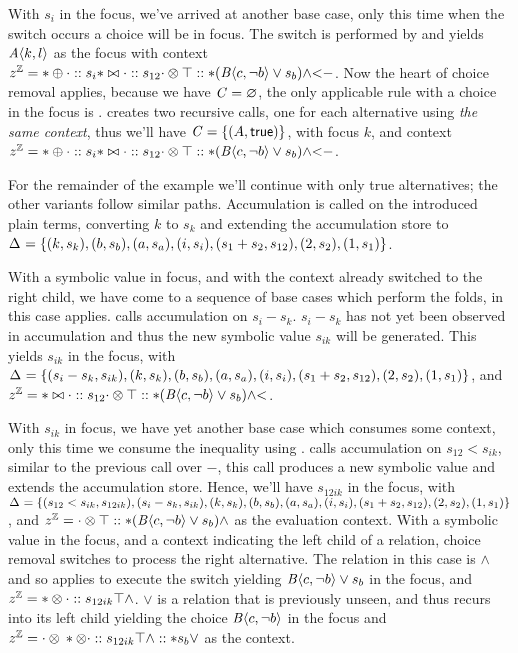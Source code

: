 With $s_{i}$ in the focus, we've arrived at another base case, only this time
when the switch occurs a choice will be in focus. The switch is performed by
\crArithL{} and yields $\chc[A]{k, l}$ as the focus with context $\zipper =
\inArithR*{s_{i}}{\inInEqR*{s_{12}}{\inBoolL*{\inRoot{}}{(\chc[B]{c,\neg b}
      \vee{} s_{b})}{\wedge}}{<}}{-}$. Now the heart of choice removal applies,
because we have $\configuration{} = \varnothing$, the only applicable rule with a
choice in the focus is \crChc. \crChc{} creates two recursive calls, one for
each alternative using \emph{the same context}, thus we'll have $\configuration=
\set{(A,\true)}$, with focus $k$, and context $\zipper =
\inArithR*{s_{i}}{\inInEqR*{s_{12}}{\inBoolL*{\inRoot{}}{(\chc[B]{c,\neg b}
      \vee{} s_{b})}{\wedge}}{<}}{-}$.

For the remainder of the example we'll continue with only true alternatives; the
other variants follow similar paths. Accumulation is called on the introduced
plain terms, converting $k$ to $s_{k}$ and extending the accumulation store to
\newline$\aStore{}=\set{(k,s_{k}),(b, s_{b}),(a,s_{a}),(i, s_{i}),(s_{1} +
  s_{2}, s_{12}), (2,s_{2}), (1,s_{1})}$.

With a symbolic value in focus, and with the context already switched to the
right child, we have come to a sequence of base cases which perform the folds,
in this case \crArithR{} applies. \crArithR{} calls accumulation on $s_{i} -
s_{k}$. $s_{i} - s_{k}$ has not yet been observed in accumulation and thus the
new symbolic value $s_{ik}$ will be generated. This yields $s_{ik}$ in the
focus, with $\aStore{}=\set{(s_{i} - s_{k}, s_{ik}), (k,s_{k}),(b,
  s_{b}),(a,s_{a}),(i, s_{i}),(s_{1} + s_{2}, s_{12}), (2,s_{2}), (1,s_{1})}$,
and $\zipper = \inInEqR*{s_{12}}{\inBoolL*{\inRoot{}}{(\chc[B]{c,\neg b} \vee{}
    s_{b})}{\wedge}}{<}$.

With $s_{ik}$ in focus, we have yet another base case which consumes some
context, only this time we consume the inequality using \crInEqR{}. \crInEqR{}
calls accumulation on $s_{12} < s_{ik}$, similar to the previous call over $-$,
this call produces a new symbolic value and extends the accumulation store.
Hence, we'll have $s_{12ik}$ in the focus, with $\aStore{}=\set{(s_{12} <
  s_{ik}, s_{12ik}),(s_{i} - s_{k}, s_{ik}), (k,s_{k}),(b, s_{b}),(a,s_{a}),(i,
  s_{i}),(s_{1} + s_{2}, s_{12}), (2,s_{2}), (1,s_{1})}$, and $\zipper =
\inBoolL*{\inRoot{}}{(\chc[B]{c,\neg b} \vee{} s_{b})}{\wedge}$ as the
evaluation context. With a symbolic value in the focus, and a context indicating
the left child of a relation, choice removal switches to process the right
alternative. The relation in this case is $\wedge$ and so \crBoolL{} applies to
execute the switch yielding $\chc[B]{c,\neg b} \vee{} s_{b}$ in the focus, and
$\zipper = \inBoolR*{s_{12ik}}{\inRoot{}}{\wedge}$. $\vee$ is a relation that is
previously unseen, and thus \crBool{} recurs into its left child yielding the
choice $\chc[B]{c, \neg b}$ in the focus and \newline$\zipper =
\inBoolL*{\inBoolR*{s_{12ik}}{\inRoot{}}{\wedge}}{s_{b}}{\vee}$ as the context.


